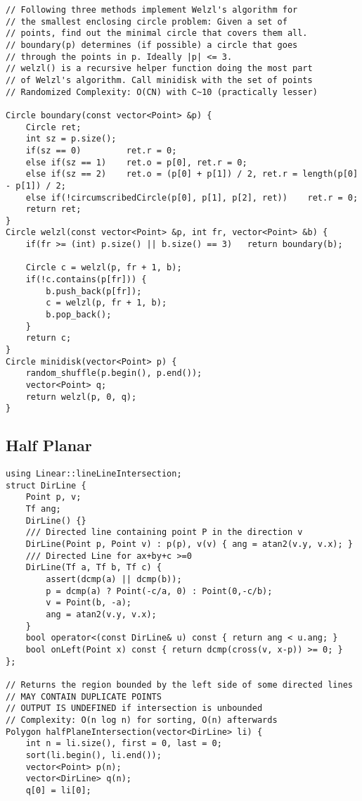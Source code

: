 \documentclass[FSZ,a4paper,onesided]{article}
\begin{document}
\begin{multicols*}{\COLS}
\begin{lstlisting}
// Following three methods implement Welzl's algorithm for
// the smallest enclosing circle problem: Given a set of
// points, find out the minimal circle that covers them all.
// boundary(p) determines (if possible) a circle that goes
// through the points in p. Ideally |p| <= 3.
// welzl() is a recursive helper function doing the most part
// of Welzl's algorithm. Call minidisk with the set of points
// Randomized Complexity: O(CN) with C~10 (practically lesser)

Circle boundary(const vector<Point> &p) {
    Circle ret;
    int sz = p.size();
    if(sz == 0)         ret.r = 0;
    else if(sz == 1)    ret.o = p[0], ret.r = 0;
    else if(sz == 2)    ret.o = (p[0] + p[1]) / 2, ret.r = length(p[0] - p[1]) / 2;
    else if(!circumscribedCircle(p[0], p[1], p[2], ret))    ret.r = 0;
    return ret;
}
Circle welzl(const vector<Point> &p, int fr, vector<Point> &b) {
    if(fr >= (int) p.size() || b.size() == 3)   return boundary(b);

    Circle c = welzl(p, fr + 1, b);
    if(!c.contains(p[fr])) {
        b.push_back(p[fr]);
        c = welzl(p, fr + 1, b);
        b.pop_back();
    }
    return c;
}
Circle minidisk(vector<Point> p) {
    random_shuffle(p.begin(), p.end());
    vector<Point> q;
    return welzl(p, 0, q);
}\end{lstlisting}
\subsection{Half Planar}
\begin{lstlisting}
using Linear::lineLineIntersection;
struct DirLine {
    Point p, v;
    Tf ang;
    DirLine() {}
    /// Directed line containing point P in the direction v
    DirLine(Point p, Point v) : p(p), v(v) { ang = atan2(v.y, v.x); }
    /// Directed Line for ax+by+c >=0
    DirLine(Tf a, Tf b, Tf c) {
        assert(dcmp(a) || dcmp(b));
        p = dcmp(a) ? Point(-c/a, 0) : Point(0,-c/b);
        v = Point(b, -a);
        ang = atan2(v.y, v.x);
    }
    bool operator<(const DirLine& u) const { return ang < u.ang; }
    bool onLeft(Point x) const { return dcmp(cross(v, x-p)) >= 0; }
};

// Returns the region bounded by the left side of some directed lines
// MAY CONTAIN DUPLICATE POINTS
// OUTPUT IS UNDEFINED if intersection is unbounded
// Complexity: O(n log n) for sorting, O(n) afterwards
Polygon halfPlaneIntersection(vector<DirLine> li) {
    int n = li.size(), first = 0, last = 0;
    sort(li.begin(), li.end());
    vector<Point> p(n);
    vector<DirLine> q(n);
    q[0] = li[0];


\end{lstlisting}
\end{multicols*}
\end{document}
